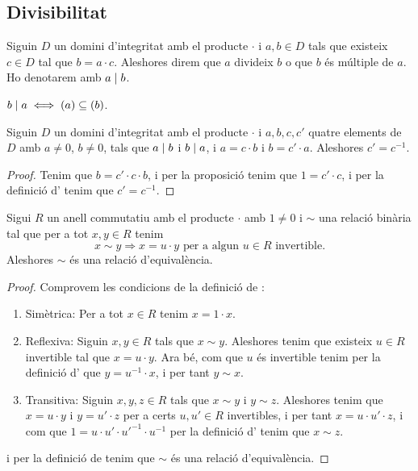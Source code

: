 \documentclass[../../Main.tex]{subfiles}
\begin{document}
	\subsection{Divisibilitat}
	\begin{definition}
		\label{def:divisor per anells}
		\label{def:múltiple per anells}
		Siguin \(D\) un domini d'integritat amb el producte \(\cdot\) i \(a,b\in D\) tals que existeix \(c\in D\) tal que \(b=a\cdot c\). Aleshores direm que \(a\) divideix \(b\) o que \(b\) és múltiple de \(a\). Ho denotarem amb \(a\mathrel{|} b\).
	\end{definition}
	\begin{observation}
		\label{obs:divisors són ideals continguts}
		\(b\mathrel{|} a\iff(a)\subseteq(b)\).
	\end{observation}
	\begin{proposition}
		\label{prop:podem passar els múltiples de costat a costat}
		Siguin \(D\) un domini d'integritat amb el producte \(\cdot\) i \(a,b,c,c'\) quatre elements de \(D\) amb \(a\neq0\), \(b\neq0\), tals que \(a\mathrel{|} b\) i \(b\mathrel{|} a\), i \(a=c\cdot b\) i \(b=c'\cdot a\). Aleshores \(c'=c^{-1}\).
		\begin{proof}
			Tenim que \(b=c'\cdot c\cdot b\), i per la proposició  tenim que \(1=c'\cdot c\), i per la definició d' tenim que \(c'=c^{-1}\).
		\end{proof}
	\end{proposition}
	\begin{proposition}
		\label{prop:associats és relació d'equivalència}
		Sigui \(R\) un anell commutatiu amb el producte \(\cdot\) amb \(1\neq0\) i \(\sim\) una relació binària tal que per a tot \(x,y\in R\) tenim
		\[x\sim y\Longrightarrow x=u\cdot y\text{ per a algun }u\in R\text{ invertible}.\]
		Aleshores \(\sim\) és una relació d'equivalència.
		\begin{proof}
			Comprovem les condicions de la definició de \myref{def:relació d'equivalència}:
			\begin{enumerate}
				\item Simètrica: Per a tot \(x\in R\) tenim \(x=1\cdot x\).
				\item Reflexiva: Siguin \(x,y\in R\) tals que \(x\sim y\). Aleshores tenim que existeix \(u\in R\) invertible tal que \(x=u\cdot y\). Ara bé, com que \(u\) és invertible tenim per la definició d' que \(y=u^{-1}\cdot x\), i per tant \(y\sim x\).
				\item Transitiva: Siguin \(x,y,z\in R\) tals que \(x\sim y\) i \(y\sim z\). Aleshores tenim que \(x=u\cdot y\) i \(y=u'\cdot z\) per a certs \(u,u'\in R\) invertibles, i per tant \(x=u\cdot u'\cdot z\), i com que \(1=u\cdot u'\cdot {u'}^{-1}\cdot{u}^{-1}\) per la definició d' tenim que \(x\sim z\).
			\end{enumerate}
			i per la definició de  tenim que \(\sim\) és una relació d'equivalència.
		\end{proof}
	\end{proposition}
\end{document}
